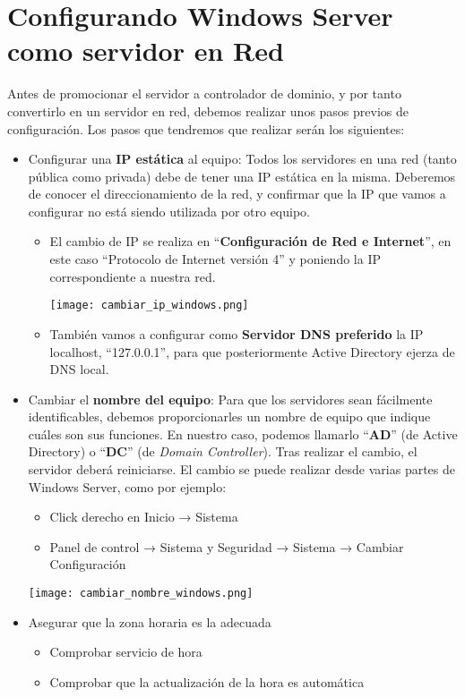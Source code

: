 \section{Configurando Windows Server como servidor en Red}
Antes de promocionar el servidor a controlador de dominio, y por tanto convertirlo en un servidor en red, debemos realizar unos pasos previos de configuración. Los pasos que tendremos que realizar serán los siguientes:

\begin{itemize}
    \item Configurar una \textbf{IP estática} al equipo: Todos los servidores en una red (tanto pública como privada) debe de tener una IP estática en la misma. Deberemos de conocer el direccionamiento de la red, y confirmar que la IP que vamos a configurar no está siendo utilizada por otro equipo.
    \begin{itemize}
        \item El cambio de IP se realiza en “\textbf{Configuración de Red e Internet}”, en este caso “Protocolo de Internet versión 4” y poniendo la IP correspondiente a nuestra red.
        \begin{center}
            \texttt{[image: cambiar\_ip\_windows.png]}
        \end{center}
        \item También vamos a configurar como \textbf{Servidor DNS preferido} la IP localhost, “127.0.0.1”, para que posteriormente Active Directory ejerza de DNS local.
    \end{itemize}

    \hypertarget{cambiar_nombre_equipo}{}
    \item Cambiar el \textbf{nombre del equipo}: Para que los servidores sean fácilmente identificables, debemos proporcionarles un nombre de equipo que indique cuáles son sus funciones. En nuestro caso, podemos llamarlo “\textbf{AD}” (de Active Directory) o “\textbf{DC}” (de \textit{Domain Controller}). Tras realizar el cambio, el servidor deberá reiniciarse. El cambio se puede realizar desde varias partes de Windows Server, como por ejemplo:
    \begin{itemize}
        \item Click derecho en Inicio → Sistema
        \item Panel de control → Sistema y Seguridad → Sistema → Cambiar Configuración
    \end{itemize}
    \begin{center}
        \texttt{[image: cambiar\_nombre\_windows.png]}
    \end{center}

    \item Asegurar que la zona horaria es la adecuada
    \begin{itemize}
        \item Comprobar servicio de hora
        \item Comprobar que la actualización de la hora es automática
    \end{itemize}

\end{itemize}


